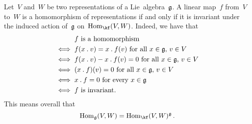 \begin{remark}
  \label{homomorphisms of representations as invariants}
  Let~$V$ and~$W$ be two representations of a Lie~algebra~$\mathfrak{g}$.
  A linear map~$f$ from~$V$ to~$W$ is a homomorphism of representations if and only if it is invariant under the induced action of~$\mathfrak{g}$ on~$\Hom_{\kf}(V,W)$.
  Indeed, we have that
  \begin{align*}
        {}& \text{$f$ is a homomorphism}  \\
    \iff{}& \text{$f(x \mathbin{.} v) = x \mathbin{.} f(v)$ for all~$x \in \mathfrak{g}$,~$v \in V$}  \\
    \iff{}& \text{$f(x \mathbin{.} v) - x \mathbin{.} f(v) = 0$ for all~$x \in \mathfrak{g}$,~$v \in V$}  \\
    \iff{}& \text{$(x \mathbin{.} f)(v) = 0$ for all~$x \in \mathfrak{g}$,~$v \in V$} \\
    \iff{}& \text{$x \mathbin{.} f = 0$ for every~$x \in \mathfrak{g}$}  \\
    \iff{}& \text{$f$ is invariant.}
  \end{align*}
  This means overall that
  \[
    \Hom_{\glie}(V,W)
    =
    \Hom_{\kf}(V,W)^{\glie} \,.
  \]
\end{remark}


